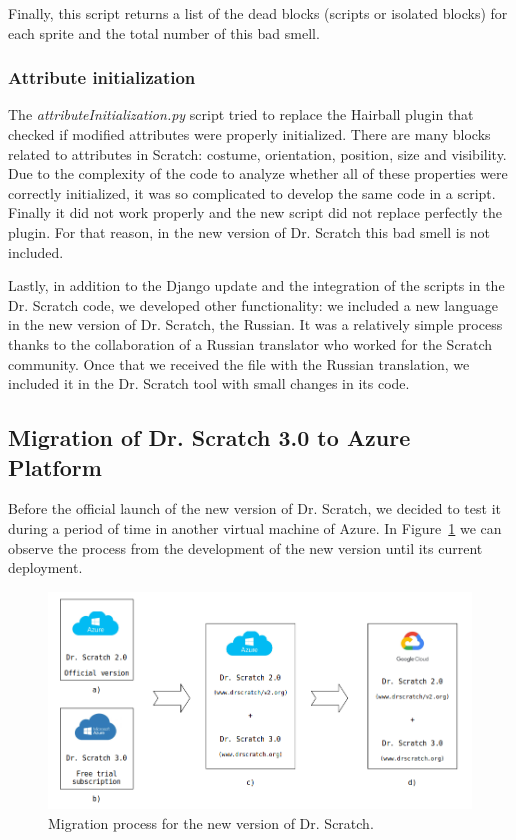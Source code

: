Finally, this script returns a list of the dead blocks (scripts or isolated blocks) for each sprite and the total number of this bad smell.

\subsubsection{Attribute initialization}
\label{subsubsec:att_initialization}

The \textit{attributeInitialization.py} script tried to replace the Hairball plugin that checked if modified attributes were properly initialized. There are many blocks related to attributes in Scratch: costume, orientation, position, size and visibility. Due to the complexity of the code to analyze whether all of these properties were correctly initialized, it was so complicated to develop the same code in a script. Finally it did not work properly and the new script did not replace perfectly the plugin. For that reason, in the new version of Dr. Scratch this bad smell is not included.

\hfill

Lastly, in addition to the Django update and the integration of the scripts in the Dr. Scratch code, we developed other functionality: we included a new language in the new version of Dr. Scratch, the Russian. It was a relatively simple process thanks to the collaboration of a Russian translator who worked for the Scratch community. Once that we received the file with the Russian translation, we included it in the Dr. Scratch tool with small changes in its code.


\subsection{Migration of Dr. Scratch 3.0 to Azure Platform}
\label{subsec:mig_to_azure}

Before the official launch of the new version of Dr. Scratch, we decided to test it during a period of time in another virtual machine of Azure. In Figure~\ref{fig:migrations} we can observe the process from the development of the new version until its current deployment.

\begin{figure}
    \centering
    \includegraphics[width=14cm, keepaspectratio]{img/migrations.png}
    \caption{Migration process for the new version of Dr. Scratch.}
    \label{fig:migrations}
\end{figure}


